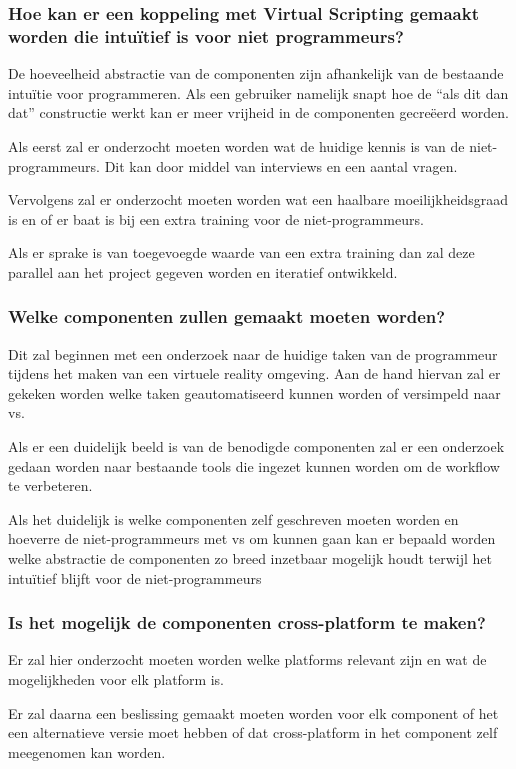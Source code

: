 \subsubsection{Hoe kan er een koppeling met Virtual Scripting gemaakt worden die intuïtief is voor niet programmeurs?}

De hoeveelheid abstractie van de componenten zijn afhankelijk van de bestaande intuïtie voor programmeren. Als een gebruiker namelijk snapt hoe de “als dit dan dat” constructie werkt kan er meer vrijheid in de componenten gecreëerd worden.

Als eerst zal er onderzocht moeten worden wat de huidige kennis is van de niet-programmeurs. Dit kan door middel van interviews en een aantal vragen.

Vervolgens zal er onderzocht moeten worden wat een haalbare moeilijkheidsgraad is en of er baat is bij een extra training voor de niet-programmeurs.

Als er sprake is van toegevoegde waarde van een extra training dan zal deze parallel aan het project gegeven worden en iteratief ontwikkeld.

\subsubsection{Welke componenten zullen gemaakt moeten worden?}
Dit zal beginnen met een onderzoek naar de huidige taken van de programmeur tijdens het maken van een virtuele reality omgeving. Aan de hand hiervan zal er gekeken worden welke taken geautomatiseerd kunnen worden of versimpeld naar \gls{vs}.

Als er een duidelijk beeld is van de benodigde componenten zal er een onderzoek gedaan worden naar bestaande tools die ingezet kunnen worden om de workflow te verbeteren.

Als het duidelijk is welke componenten zelf geschreven moeten worden en hoeverre de niet-programmeurs met \gls{vs} om kunnen gaan kan er bepaald worden welke abstractie de componenten zo breed inzetbaar mogelijk houdt terwijl het intuïtief blijft voor de niet-programmeurs

\subsubsection{Is het mogelijk de componenten cross-platform te maken?}
Er zal hier onderzocht moeten worden welke platforms relevant zijn en wat de mogelijkheden voor elk platform is.

Er zal daarna een beslissing gemaakt moeten worden voor elk component of het een alternatieve versie moet hebben of dat cross-platform in het component zelf meegenomen kan worden.
